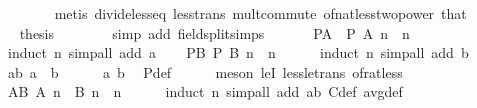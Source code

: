 \begin{isabellebody}
\ \ \ \ \ \ \isamarkupfalse%
\ {\isacharparenleft}{\kern0pt}metis\ divide{\isacharunderscore}{\kern0pt}less{\isacharunderscore}{\kern0pt}eq\ less{\isacharunderscore}{\kern0pt}trans\ mult{\isachardot}{\kern0pt}commute\ of{\isacharunderscore}{\kern0pt}nat{\isacharunderscore}{\kern0pt}less{\isacharunderscore}{\kern0pt}two{\isacharunderscore}{\kern0pt}power\ that{\isacharparenright}{\kern0pt}\isanewline
\ \ \ \ \isamarkupfalse%
\ \isamarkupfalse%
\ {\isacharquery}{\kern0pt}thesis\isanewline
\ \ \ \ \ \ \isamarkupfalse%
\ {\isacharparenleft}{\kern0pt}simp\ add{\isacharcolon}{\kern0pt}\ field{\isacharunderscore}{\kern0pt}split{\isacharunderscore}{\kern0pt}simps{\isacharparenright}{\kern0pt}\isanewline
\ \ \isamarkupfalse%
\isanewline
\ \ \isamarkupfalse%
\ PA{\isacharcolon}{\kern0pt}\ {\isachardoublequoteopen}{\isasymnot}\ P\ {\isacharparenleft}{\kern0pt}A\ n{\isacharparenright}{\kern0pt}{\isachardoublequoteclose}\ \ n\isanewline
\ \ \ \ \isamarkupfalse%
\ {\isacharparenleft}{\kern0pt}induct\ n{\isacharparenright}{\kern0pt}\ {\isacharparenleft}{\kern0pt}simp{\isacharunderscore}{\kern0pt}all\ add{\isacharcolon}{\kern0pt}\ a{\isacharparenright}{\kern0pt}\isanewline
\ \ \isamarkupfalse%
\ PB{\isacharcolon}{\kern0pt}\ {\isachardoublequoteopen}P\ {\isacharparenleft}{\kern0pt}B\ n{\isacharparenright}{\kern0pt}{\isachardoublequoteclose}\ \ n\isanewline
\ \ \ \ \isamarkupfalse%
\ {\isacharparenleft}{\kern0pt}induct\ n{\isacharparenright}{\kern0pt}\ {\isacharparenleft}{\kern0pt}simp{\isacharunderscore}{\kern0pt}all\ add{\isacharcolon}{\kern0pt}\ b{\isacharparenright}{\kern0pt}\isanewline
\ \ \isamarkupfalse%
\ ab{\isacharcolon}{\kern0pt}\ {\isachardoublequoteopen}a\ {\isacharless}{\kern0pt}\ b{\isachardoublequoteclose}\isanewline
\ \ \ \ \isamarkupfalse%
\ a\ b\ \isamarkupfalse%
\ P{\isacharunderscore}{\kern0pt}def\isanewline
\ \ \ \ \isamarkupfalse%
\ {\isacharparenleft}{\kern0pt}meson\ leI\ less{\isacharunderscore}{\kern0pt}le{\isacharunderscore}{\kern0pt}trans\ of{\isacharunderscore}{\kern0pt}rat{\isacharunderscore}{\kern0pt}less{\isacharparenright}{\kern0pt}\isanewline
\ \ \isamarkupfalse%
\ AB{\isacharcolon}{\kern0pt}\ {\isachardoublequoteopen}A\ n\ {\isacharless}{\kern0pt}\ B\ n{\isachardoublequoteclose}\ \ n\isanewline
\ \ \ \ \isamarkupfalse%
\ {\isacharparenleft}{\kern0pt}induct\ n{\isacharparenright}{\kern0pt}\ {\isacharparenleft}{\kern0pt}simp{\isacharunderscore}{\kern0pt}all\ add{\isacharcolon}{\kern0pt}\ ab\ C{\isacharunderscore}{\kern0pt}def\ avg{\isacharunderscore}{\kern0pt}def{\isacharparenright}{\kern0pt}\isanewline

\end{isabellebody}
